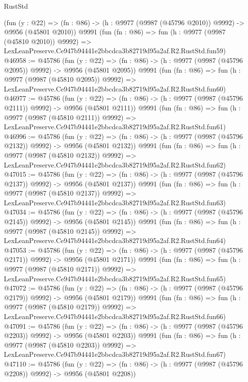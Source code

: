 \begin{lexlean}{RustStd}
\begin{coremodule}
    (fun (y : @22) =>
    (fn : @86) -> (h : @9977 (@9987 (@45796 @2010)) @9992) -> @9956 (@45801 @2010))
    @9991
    (fun (fn : @86) =>
    fun (h : @9977 (@9987 (@45810 @2010)) @9992) =>
    LexLeanPreserve.Ce947b94441e2bbcdca3b82719d95a2af.R2.RustStd.fun59)
@46958 := @45786
    (fun (y : @22) =>
    (fn : @86) -> (h : @9977 (@9987 (@45796 @2095)) @9992) -> @9956 (@45801 @2095))
    @9991
    (fun (fn : @86) =>
    fun (h : @9977 (@9987 (@45810 @2095)) @9992) =>
    LexLeanPreserve.Ce947b94441e2bbcdca3b82719d95a2af.R2.RustStd.fun60)
@46977 := @45786
    (fun (y : @22) =>
    (fn : @86) -> (h : @9977 (@9987 (@45796 @2111)) @9992) -> @9956 (@45801 @2111))
    @9991
    (fun (fn : @86) =>
    fun (h : @9977 (@9987 (@45810 @2111)) @9992) =>
    LexLeanPreserve.Ce947b94441e2bbcdca3b82719d95a2af.R2.RustStd.fun61)
@46996 := @45786
    (fun (y : @22) =>
    (fn : @86) -> (h : @9977 (@9987 (@45796 @2132)) @9992) -> @9956 (@45801 @2132))
    @9991
    (fun (fn : @86) =>
    fun (h : @9977 (@9987 (@45810 @2132)) @9992) =>
    LexLeanPreserve.Ce947b94441e2bbcdca3b82719d95a2af.R2.RustStd.fun62)
@47015 := @45786
    (fun (y : @22) =>
    (fn : @86) -> (h : @9977 (@9987 (@45796 @2137)) @9992) -> @9956 (@45801 @2137))
    @9991
    (fun (fn : @86) =>
    fun (h : @9977 (@9987 (@45810 @2137)) @9992) =>
    LexLeanPreserve.Ce947b94441e2bbcdca3b82719d95a2af.R2.RustStd.fun63)
@47034 := @45786
    (fun (y : @22) =>
    (fn : @86) -> (h : @9977 (@9987 (@45796 @2145)) @9992) -> @9956 (@45801 @2145))
    @9991
    (fun (fn : @86) =>
    fun (h : @9977 (@9987 (@45810 @2145)) @9992) =>
    LexLeanPreserve.Ce947b94441e2bbcdca3b82719d95a2af.R2.RustStd.fun64)
@47053 := @45786
    (fun (y : @22) =>
    (fn : @86) -> (h : @9977 (@9987 (@45796 @2171)) @9992) -> @9956 (@45801 @2171))
    @9991
    (fun (fn : @86) =>
    fun (h : @9977 (@9987 (@45810 @2171)) @9992) =>
    LexLeanPreserve.Ce947b94441e2bbcdca3b82719d95a2af.R2.RustStd.fun65)
@47072 := @45786
    (fun (y : @22) =>
    (fn : @86) -> (h : @9977 (@9987 (@45796 @2179)) @9992) -> @9956 (@45801 @2179))
    @9991
    (fun (fn : @86) =>
    fun (h : @9977 (@9987 (@45810 @2179)) @9992) =>
    LexLeanPreserve.Ce947b94441e2bbcdca3b82719d95a2af.R2.RustStd.fun66)
@47091 := @45786
    (fun (y : @22) =>
    (fn : @86) -> (h : @9977 (@9987 (@45796 @2203)) @9992) -> @9956 (@45801 @2203))
    @9991
    (fun (fn : @86) =>
    fun (h : @9977 (@9987 (@45810 @2203)) @9992) =>
    LexLeanPreserve.Ce947b94441e2bbcdca3b82719d95a2af.R2.RustStd.fun67)
@47110 := @45786
    (fun (y : @22) =>
    (fn : @86) -> (h : @9977 (@9987 (@45796 @2208)) @9992) -> @9956 (@45801 @2208))

\end{coremodule}
\end{lexlean}

